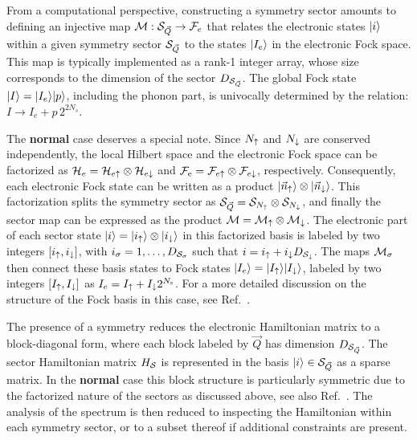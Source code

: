 \documentclass[edipack_sp.tex]{subfiles}
\begin{document}
From a computational perspective, constructing a symmetry
sector amounts to defining an injective map
${\cal M}:{\cal S}_{\vec{Q}}\rightarrow {\cal F}_e$ that relates the electronic states $|i\rangle$
within a given symmetry sector ${\cal S}_{\vec{Q}}$ to the states $|I_e\rangle$ in the electronic Fock space. 
This map is typically implemented as a rank-1
integer array, whose size corresponds to the dimension of the sector $D_{{\cal S}_{\vec{Q}}}$. 
The global Fock state $|I\rangle=|I_e\rangle|p\rangle$, including the phonon part, is univocally determined by the relation: $I\to I_e + p\,2^{2 N_s}$.


The {\bf normal} case deserves a special note. Since $N_\uparrow$ and
$N_\downarrow$ are conserved independently, the local Hilbert
space and the electronic Fock space can be factorized as
${\cal H}_e={\cal H}_{e\uparrow}\otimes{\cal H}_{e\downarrow}$ and ${\cal F}_\mathrm{e} = {\cal F}_{e\uparrow}\otimes {\cal F}_{e\downarrow}$, respectively.  
Consequently, each electronic Fock state can be written as a product $|\vec{n}_\uparrow\rangle\otimes |\vec{n}_\downarrow\rangle$. This factorization splits the
symmetry sector as ${\cal S}_{\vec{Q}} = {\cal S}_{N_\uparrow}\otimes{\cal S}_{N_\downarrow}$,
and finally the sector map can be expressed as the product ${\cal M} = {\cal M}_\uparrow
\otimes {\cal M}_\downarrow$.
%
The electronic part of each sector state $|i\rangle=|i_\uparrow\rangle \otimes |i_\downarrow\rangle$ in this factorized basis
is labeled by two integers $[i_\uparrow,i_\downarrow]$, with 
$i_\sigma=1,\dots,D_{{\cal S}_\sigma}$ such that $i=i_\uparrow + i_\downarrow
D_{{\cal S}_\downarrow}$.
The maps ${\cal M}_\sigma$ then connect these basis states to Fock states
$|I_e\rangle=|I_\uparrow\rangle|I_\downarrow\rangle$, labeled by two integers
$[I_\uparrow,I_\downarrow]$ as $I_e=I_\uparrow +   I_\downarrow 2^{N_\mathrm{s}}$.
For a more detailed discussion on the structure of the Fock basis in this case, see Ref.~\cite{Amaricci2022CPC}. 

The presence of a symmetry reduces the electronic Hamiltonian matrix to
a block-diagonal form, where each block labeled by $\vec{Q}$ has dimension
$D_{{\cal S}_{\vec{Q}}}$. The sector Hamiltonian matrix $H_{\cal S}$ is represented in the
basis $|i\rangle\in{\cal S}_{\vec{Q}}$ as a sparse matrix.
In the {\bf normal} case this block structure is particularly
symmetric due to the factorized nature of the sectors as discussed
above, see also Ref.~\cite{Amaricci2022CPC}.
The analysis of the spectrum is then reduced to inspecting the
Hamiltonian within each symmetry sector, or to a subset thereof if
additional constraints are present.



\end{document}
